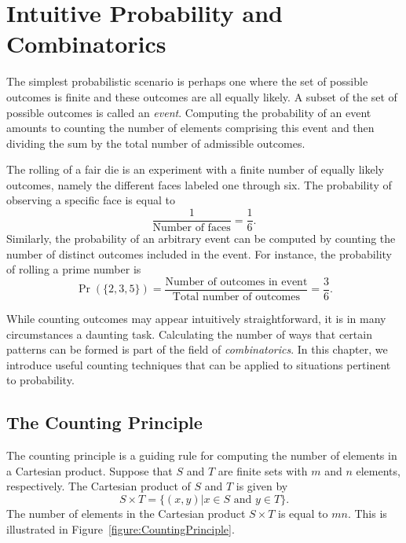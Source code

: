 \chapter{Intuitive Probability and Combinatorics}

The simplest probabilistic scenario is perhaps one where the set of possible outcomes is finite and these outcomes are all equally likely.
A subset of the set of possible outcomes is called an \emph{event}.
Computing the probability of an event amounts to counting the number of elements comprising this event and then dividing the sum by the total number of admissible outcomes.

\begin{example}
The rolling of a fair die is an experiment with a finite number of equally likely outcomes, namely the different faces labeled one through six.
The probability of observing a specific face is equal to
\begin{equation*}
\frac{1}{\text{Number of faces}} = \frac{1}{6} .
\end{equation*}
Similarly, the probability of an arbitrary event can be computed by counting the number of distinct outcomes included in the event.
For instance, the probability of rolling a prime number is
\begin{equation*}
\Pr ( \{ 2, 3, 5 \} )
= \frac{\text{Number of outcomes in event}}{\text{Total number of outcomes}}
= \frac{3}{6} .
\end{equation*}
\end{example}

While counting outcomes may appear intuitively straightforward, it is in many circumstances a daunting task.
Calculating the number of ways that certain patterns can be formed is part of the field of \emph{combinatorics}. 
In this chapter, we introduce useful counting techniques that can be applied to situations pertinent to probability.


\section{The Counting Principle}

The counting principle is a guiding rule for computing the number of elements in a Cartesian product.
Suppose that $S$ and $T$ are finite sets with $m$ and $n$ elements, respectively.
The Cartesian product of $S$ and $T$ is given by
\begin{equation*}
S \times T = \{ (x, y) | x \in S \text{ and } y \in T \} .
\end{equation*}
The number of elements in the Cartesian product $S \times T$ is equal to $m n$.
This is illustrated in Figure~\ref{figure:CountingPrinciple}.

